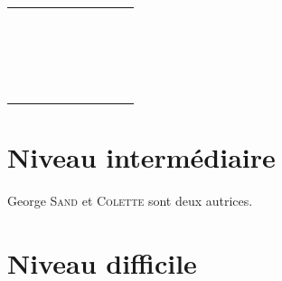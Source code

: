 \documentclass[12pt]{article}
\newcommand{\auteur}[2]{#1 \textsc{#2}}
\begin{document}
\begin{tabular}{|r|r|r|r|r|r|r|r|r|r|}
	\hline
	&  &  &  &  &  &  &  &  &  \\
	\hline
	&  &  &  &  &  &  &  &  &  \\
	\hline
	&  &  &  &  &  &  &  &  &  \\
	\hline
	&  &  &  &  &  &  &  &  &  \\
	\hline
	&  &  &  &  &  &  &  &  &  \\
	\hline
	&  &  &  &  &  &  &  &  &  \\
	\hline
	&  &  &  &  &  &  &  &  &  \\
	\hline
	&  &  &  &  &  &  &  &  &  \\
	\hline
	&  &  &  &  &  &  &  &  &  \\
	\hline
	&  &  &  &  &  &  &  &  &  \\
	\hline
	&  &  &  &  &  &  &  &  &  \\
	\hline
	&  &  &  &  &  &  &  &  &  \\
	\hline
	&  &  &  &  &  &  &  &  &  \\
	\hline
	&  &  &  &  &  &  &  &  &  \\
	\hline
	&  &  &  &  &  &  &  &  &  \\
	\hline
	&  &  &  &  &  &  &  &  &  \\
	\hline
	&  &  &  &  &  &  &  &  &  \\
	\hline
	&  &  &  &  &  &  &  &  &  \\
	\hline
	&  &  &  &  &  &  &  &  &  \\
	\hline
	&  &  &  &  &  &  &  &  &  \\
	\hline
	&  &  &  &  &  &  &  &  &  \\
	\hline
\end{tabular}



\section*{Niveau intermédiaire}

\auteur{George}{Sand} et \auteur{}{Colette} sont deux autrices.


\section*{Niveau difficile}

%
\end{document}

